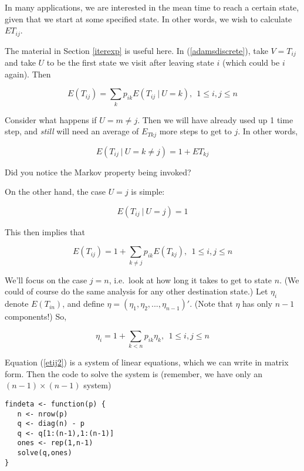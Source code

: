 In many applications, we are interested in the mean time to reach a
certain state, given that we start at some specified state.  In other
words, we wish to calculate $ET_{ij}$.

The material in Section \ref{iterexp} is useful here.  In
(\ref{adamsdiscrete}), take $V = T_{ij}$ and take $U$ to be the first
state we visit after leaving state $i$ (which could be $i$ again).  Then

\begin{equation}
\label{etij}
E(T_{ij}) = \sum_{k} p_{ik} E(T_{ij} ~|~ U = k), ~~
1 \leq i,j \leq n
\end{equation}

Consider what happens if $U = m \neq j$.  Then we will have already used
up 1 time step, and {\it still} will need an average of $E_{Tkj}$ more
steps to get to $j$.  In other words,

\begin{equation}
E(T_{ij} ~|~ U = k \neq j) = 1 + ET_{kj}
\end{equation}

Did you notice the Markov property being invoked?

On the other hand, the case $U = j$ is simple:

\begin{equation}
E(T_{ij} ~|~ U = j) = 1 
\end{equation}

This then implies that

\begin{equation}
\label{etij1}
E(T_{ij}) 
= 1 + \sum_{k \neq j} p_{ik} E(T_{kj}), ~~
1 \leq i,j \leq n
\end{equation}

We'll focus on the case $j = n$, i.e.\ look at how long it takes to get
to state $n$.  (We could of course do the same analysis for any other
destination state.)
Let $\eta_{i}$ denote $E(T_{in})$, and define  $\eta =
(\eta_1,\eta_2,...,\eta_{n-1})'$.  (Note that $\eta$ has only $n-1$
components!)  So,

\begin{equation}
\label{etij2}
\eta_{i}
= 1 + \sum_{k < n} p_{ik} \eta_k, ~~
1 \leq i,j \leq n
\end{equation}

Equation (\ref{etij2}) is a system of linear equations, which we can
write in matrix form.  Then the code to solve the system is
(remember, we have only an $(n-1) \times (n-1)$ system)

\begin{lstlisting}                                                              
findeta <- function(p) {                                                        
   n <- nrow(p)                                                                 
   q <- diag(n) - p                                                             
   q <- q[1:(n-1),1:(n-1)]                                                      
   ones <- rep(1,n-1)                                                           
   solve(q,ones)                                                                
}                                                                               
\end{lstlisting}                        

